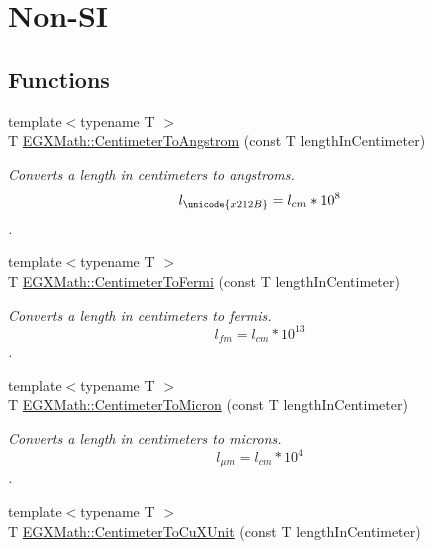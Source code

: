 \hypertarget{group___e_g_x_math-_conversions-_length_conversions-_centimeter-_non-_s_i}{}\section{Non-\/\+SI}
\label{group___e_g_x_math-_conversions-_length_conversions-_centimeter-_non-_s_i}
\subsection*{Functions}
\begin{DoxyCompactItemize}
\item 
{\footnotesize template$<$typename T $>$ }\\T \mbox{\hyperlink{group___e_g_x_math-_conversions-_length_conversions-_centimeter-_non-_s_i_gacabf2b01cd8676ffb5ec8c70ecd621b6}{E\+G\+X\+Math\+::\+Centimeter\+To\+Angstrom}} (const T length\+In\+Centimeter)
\begin{DoxyCompactList}\small\item\em Converts a length in centimeters to angstroms. \[ l_{\unicode{x212B}}=l_{cm} * 10^{8} \]. \end{DoxyCompactList}\item 
{\footnotesize template$<$typename T $>$ }\\T \mbox{\hyperlink{group___e_g_x_math-_conversions-_length_conversions-_centimeter-_non-_s_i_ga0b55e847f11e0ba8313d4556d23684dd}{E\+G\+X\+Math\+::\+Centimeter\+To\+Fermi}} (const T length\+In\+Centimeter)
\begin{DoxyCompactList}\small\item\em Converts a length in centimeters to fermis. \[ l_{fm}=l_{cm} * 10^{13} \]. \end{DoxyCompactList}\item 
{\footnotesize template$<$typename T $>$ }\\T \mbox{\hyperlink{group___e_g_x_math-_conversions-_length_conversions-_centimeter-_non-_s_i_gaee509ac676e86ed54994792f82dab9f7}{E\+G\+X\+Math\+::\+Centimeter\+To\+Micron}} (const T length\+In\+Centimeter)
\begin{DoxyCompactList}\small\item\em Converts a length in centimeters to microns. \[ l_{\mu m}=l_{cm} * 10^{4} \]. \end{DoxyCompactList}\item 
{\footnotesize template$<$typename T $>$ }\\T \mbox{\hyperlink{group___e_g_x_math-_conversions-_length_conversions-_centimeter-_non-_s_i_ga98d44269c80a1c5ab7c38d27aba39517}{E\+G\+X\+Math\+::\+Centimeter\+To\+Cu\+X\+Unit}} (const T length\+In\+Centimeter)

\end{DoxyCompactItemize}
